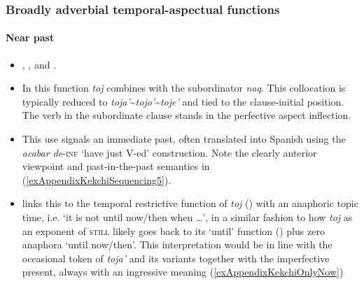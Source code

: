 \subsubsection{Broadly adverbial temporal-aspectual functions}
\paragraph{Near past} \label{appendixKekchiImmediatePast}
\begin{itemize}
	\item \textcite[171, 303]{VocabularioKechi2004}, \textcite[202]{EachusCarlson1980}, \textcite{Kockelman2020} and \textcite[360]{SamJuarezEtAl2003}.
	\item In this function \textit{toj} combines with the subordinator \textit{naq}. This collocation is typically reduced to \textit{toja'}\sim\textit{tojo'}\sim\textit{toje'} and tied to the clause-initial position.	The verb in the subordinate clause stands in the perfective aspect inflection.
	\item This use signals an immediate past, often translated into Spanish using the \textit{acabar de}-\textsc{inf}  \lq have just V-ed\rq{ }construction. Note the clearly anterior viewpoint and past-in-the-past semantics in (\ref{exAppendixKekchiSequencing5}).
\item \textcite{Kockelman2020} links this to the temporal restrictive function of \textit{toj} () with an anaphoric topic time, i.e. \lq it is not until now/then when …\rq{}, in a similar fashion to how \textit{toj} as an exponent of \textsc{still} likely goes back to its \lq until\rq{ }function () plus zero anaphora \lq until now/then\rq{}. This interpretation would be in line with the occasional token of \textit{toja\rq{}} and its variants together with the imperfective present, always with an ingressive meaning (\ref{exAppendixKekchiOnlyNow})
\end{itemize}

